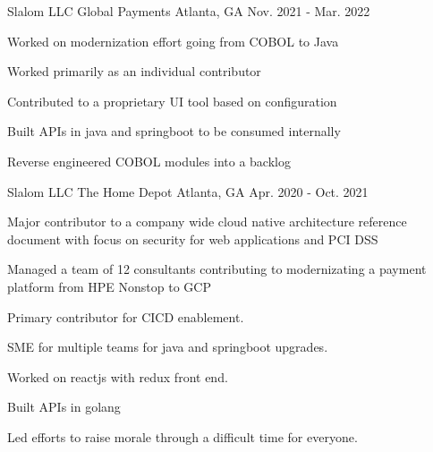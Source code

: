 

\begin{cventries}

\cventry
{Slalom LLC} %
{Global Payments} %
{Atlanta, GA} %
{Nov. 2021 - Mar. 2022} %
{
  \begin{cvitems} %
    \item {Worked on modernization effort going from COBOL to Java}
    \item {Worked primarily as an individual contributor}
    \item {Contributed to a proprietary UI tool based on configuration}
    \item {Built APIs in java and springboot to be consumed internally}
    \item {Reverse engineered COBOL modules into a backlog}
  \end{cvitems}
}

\cventry
{Slalom LLC} %
{The Home Depot} %
{Atlanta, GA} %
{Apr. 2020 - Oct. 2021} %
{
  \begin{cvitems} %
    \item {Major contributor to a company wide cloud native architecture reference document with focus on security for web applications and PCI DSS}
    \item {Managed a team of 12 consultants contributing to modernizating a payment platform from HPE Nonstop to GCP}
    \item {Primary contributor for CICD enablement.}
    \item {SME for multiple teams for java and springboot upgrades.}
    \item {Worked on reactjs with redux front end.}
    \item {Built APIs in golang}
    \item {Led efforts to raise morale through a difficult time for everyone.}
  \end{cvitems}
}


\end{cventries}
